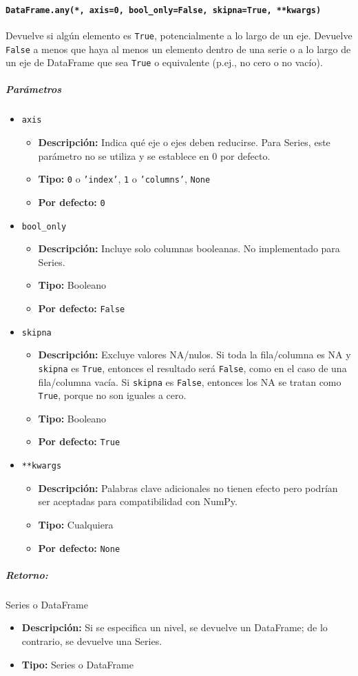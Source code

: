\paragraph{\texttt{DataFrame.any(*, axis=0, bool\_only=False, skipna=True, **kwargs)}}
Devuelve si algún elemento es \texttt{True}, potencialmente a lo largo de un eje. Devuelve \texttt{False} a menos que haya al menos un elemento dentro de una serie o a lo largo de un eje de DataFrame que sea \texttt{True} o equivalente (p.ej., no cero o no vacío).
\subparagraph{\textbf{Parámetros}}
\begin{itemize}
\item \texttt{axis}
\begin{itemize}
\item \textbf{Descripción:} Indica qué eje o ejes deben reducirse. Para Series, este parámetro no se utiliza y se establece en 0 por defecto.
\item \textbf{Tipo:} \texttt{0} o \texttt{'index'}, \texttt{1} o \texttt{'columns'}, \texttt{None}
\item \textbf{Por defecto:} \texttt{0}
\end{itemize}
\item \texttt{bool\_only}
\begin{itemize}
\item \textbf{Descripción:} Incluye solo columnas booleanas. No implementado para Series.
\item \textbf{Tipo:} Booleano
\item \textbf{Por defecto:} \texttt{False}
\end{itemize}
\item \texttt{skipna}
\begin{itemize}
\item \textbf{Descripción:} Excluye valores NA/nulos. Si toda la fila/columna es NA y \texttt{skipna} es \texttt{True}, entonces el resultado será \texttt{False}, como en el caso de una fila/columna vacía. Si \texttt{skipna} es \texttt{False}, entonces los NA se tratan como \texttt{True}, porque no son iguales a cero.
\item \textbf{Tipo:} Booleano
\item \textbf{Por defecto:} \texttt{True}
\end{itemize}
\item \texttt{**kwargs}
\begin{itemize}
\item \textbf{Descripción:} Palabras clave adicionales no tienen efecto pero podrían ser aceptadas para compatibilidad con NumPy.
\item \textbf{Tipo:} Cualquiera
\item \textbf{Por defecto:} \texttt{None}
\end{itemize}
\end{itemize}
\subparagraph{Retorno:} Series o DataFrame
\begin{itemize}
\item \textbf{Descripción:} Si se especifica un nivel, se devuelve un DataFrame; de lo contrario, se devuelve una Series.
\item \textbf{Tipo:} Series o DataFrame
\end{itemize}
